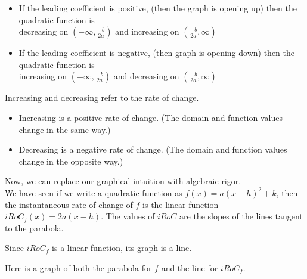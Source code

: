 \documentclass{ximera}
\begin{document}
\begin{itemize}
\item If the leading coefficient is positive, (then the graph is opening up) then the quadratic function is \\

decreasing on $\left( -\infty, \frac{-b}{2a} \right)$ and increasing on $\left( \frac{-b}{2a}, \infty \right)$

\item If the leading coefficient is negative, (then graph is opening down) then the quadratic function is \\

increasing on $\left( -\infty, \frac{-b}{2a} \right)$ and decreasing on $\left( \frac{-b}{2a}, \infty \right)$
\end{itemize}





Increasing and decreasing refer to the rate of change.


\begin{itemize}
\item Increasing is a positive rate of change. (The domain and function values change in the same way.)
\item Decreasing is a negative rate of change. (The domain and function values change in the opposite way.)
\end{itemize}



Now, we can replace our graphical intuition with algebraic rigor. \\ 

We have seen if we write a quadratic function as $f(x) = a (x - h)^2 + k$, then the instantaneous rate of change of $f$ is the linear function $iRoC_f(x) = 2 a (x - h)$. The values of $iRoC$ are the slopes of the lines tangent to the parabola.


Since $iRoC_f$ is a linear function, its graph is a line.


Here is a graph of both the parabola for $f$ and the line for $iRoC_f$.
\end{document}
